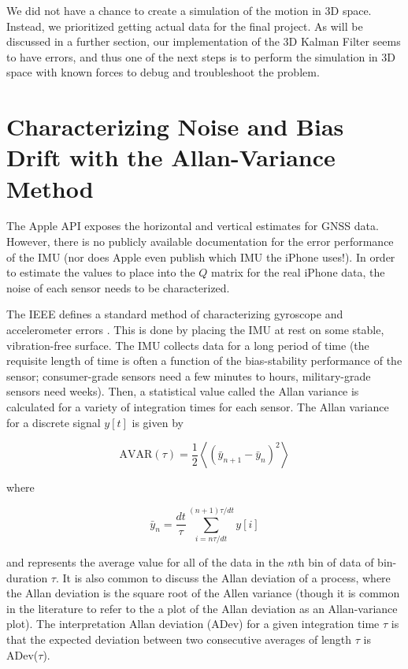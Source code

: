 \documentclass[10pt]{article}
\begin{document}
We did not have a chance to create a simulation of the motion in 3D space. Instead, we prioritized getting actual data for the final project. As will be discussed in a further section, our implementation of the 3D Kalman Filter seems to have errors, and thus one of the next steps is to perform the simulation in 3D space with known forces to debug and troubleshoot the problem.

\section{Characterizing Noise and Bias Drift with the Allan-Variance Method}

The Apple API exposes the horizontal and vertical estimates for GNSS data. However, there is no publicly available documentation for the error performance of the IMU (nor does Apple even publish which IMU the iPhone uses!). In order to estimate the values to place into the $Q$ matrix for the real iPhone data, the noise of each sensor needs to be characterized.

The IEEE defines a standard method of characterizing gyroscope and accelerometer errors \cite{IEEEgyroscopecharacterization}. This is done by placing the IMU at rest on some stable, vibration-free surface. The IMU collects data for a long period of time (the requisite length of time is often a function of the bias-stability performance of the sensor; consumer-grade sensors need a few minutes to hours, military-grade sensors need weeks). Then, a statistical value called the Allan variance is calculated for a variety of integration times for each sensor. The Allan variance for a discrete signal $y[t]$ is given by

\begin{equation}
\mathrm{AVAR}(\tau) = \frac12 \left< (\bar{y}_{n+1} - \bar{y}_n )^2 \right>
\end{equation}

where 

\begin{equation}
  \bar{y}_n = \frac{dt}{\tau}\sum_{i = n\tau/dt}^{(n+1)\tau/dt} y[i]
\end{equation}

and represents the average value for all of the data in the $n$th bin of data of bin-duration $\tau$. It is also common to discuss the Allan deviation of a process, where the Allan deviation is the square root of the Allen variance (though it is common in the literature to refer to the a plot of the Allan deviation as an Allan-variance plot). The interpretation Allan deviation (ADev) for a given integration time $\tau$ is that the expected deviation between two consecutive averages of length $\tau$ is ADev($\tau$).
\end{document}
